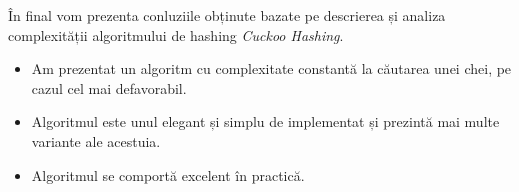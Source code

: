 \documentclass[a4paper]{article}
\theoremstyle{remark}
\theoremstyle{definition}
\begin{document}
În final vom prezenta conluziile obținute bazate pe descrierea și analiza complexității algoritmului de hashing \textit{Cuckoo Hashing}.

\begin{itemize}

\item Am prezentat un algoritm cu complexitate constantă la căutarea unei chei, pe cazul cel mai defavorabil.

\item Algoritmul este unul elegant și simplu de implementat și prezintă mai multe variante ale acestuia.

\item Algoritmul se comportă excelent în practică.

\end{itemize}

\newpage

\nocite{*}

{}

\end{document}
